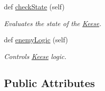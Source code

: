 \begin{DoxyCompactItemize}
def \hyperlink{classactor_1_1keese_1_1_keese_a2c191c26fc310458619fdf49166e8434}{check\+State} (self)
\begin{DoxyCompactList}\small\item\em Evaluates the state of the \hyperlink{classactor_1_1keese_1_1_keese}{Keese}. \end{DoxyCompactList}\item 
def \hyperlink{classactor_1_1keese_1_1_keese_a838343717716ba48c0519e73d702cac9}{enemy\+Logic} (self)
\begin{DoxyCompactList}\small\item\em Controls \hyperlink{classactor_1_1keese_1_1_keese}{Keese} logic. \end{DoxyCompactList}\end{DoxyCompactItemize}
\subsection*{Public Attributes}
